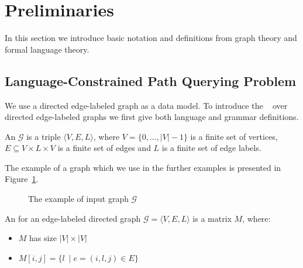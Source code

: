 \section{Preliminaries}

In this section we introduce basic notation and definitions from graph theory and formal language theory.

\subsection{Language-Constrained Path Querying Problem}

We use a directed edge-labeled graph as a data model. 
To introduce the ~\citep{barrett2000formal} over directed edge-labeled graphs we first give both language and grammar definitions.

\begin{definition}
An  $\mathcal{G}$ is a triple $\langle V,E,L \rangle$, where $V = \{0, \ldots, |V|-1\}$ is a finite set of vertices, $E \subseteq V \times L \times V$ is a finite set of edges and $L$ is a finite set of edge labels.
\end{definition}

The example of a graph which we use in the further examples is presented in Figure~\ref{fig:example_input_graph}.

\begin{figure}[h]
    \centering        
    \caption{The example of input graph $\mathcal{G}$}
    \label{fig:example_input_graph}
\end{figure}

\begin{definition}
An  for an edge-labeled directed graph $\mathcal{G} = \langle V,E,L \rangle$ is a matrix $M$, where:
\begin{itemize}
    \item $M$ has size $|V|\times|V|$
    \item $M[i,j] = \{l~\mid e = (i,l,j) \in E\}$
\end{itemize}
\end{definition}

